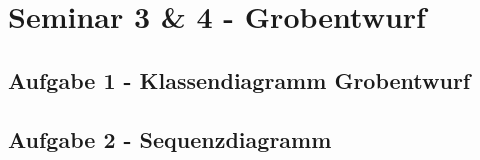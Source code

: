 
\section{Seminar 3 \& 4 - Grobentwurf}

	\subsection{Aufgabe 1 - Klassendiagramm Grobentwurf}
	
	\subsection{Aufgabe 2 - Sequenzdiagramm}
	
